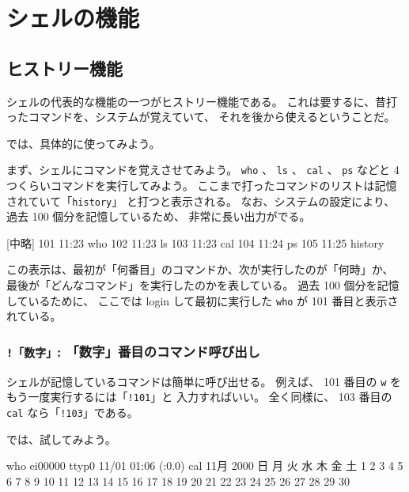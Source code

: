 \newpage

\section{シェルの機能}

\subsection{ヒストリー機能}

シェルの代表的な機能の一つがヒストリー機能である。
これは要するに、昔打ったコマンドを、システムが覚えていて、
それを後から使えるということだ。

\bigskip

では、具体的に使ってみよう。

まず、シェルにコマンドを覚えさせてみよう。
\texttt{who} 、 \texttt{ls} 、 \texttt{cal} 、 \texttt{ps} などと
 4 つくらいコマンドを実行してみよう。
ここまで打ったコマンドのリストは記憶されていて「\texttt{history}」
と打つと表示される。
なお、システムの設定により、過去 100 個分を記憶しているため、
非常に長い出力がでる。

\begin{progls}
 [中略]
   101  11:23   who
   102  11:23   ls
   103  11:23   cal
   104  11:24   ps
   105  11:25   history
%
\end{progls}

この表示は、最初が「何番目」のコマンドか、次が実行したのが「何時」か、
最後が「どんなコマンド」を実行したのかを表している。
過去 100 個分を記憶しているために、
ここでは login して最初に実行した \texttt{who} が 101 番目と表示されている。

\subsubsection{\texttt{!「数字」}: 「数字」番目のコマンド呼び出し}

シェルが記憶しているコマンドは簡単に呼び出せる。
例えば、 101 番目の \texttt{w} をもう一度実行するには「\texttt{!101}」と
入力すればいい。
全く同様に、 103 番目の \texttt{cal} なら「\texttt{!103}」である。

では、試してみよう。

\begin{progls}
who
ei00000  ttyp0    11/01 01:06   (:0.0)
cal
     11月 2000
日 月 火 水 木 金 土
          1  2  3  4
 5  6  7  8  9 10 11
12 13 14 15 16 17 18
19 20 21 22 23 24 25
26 27 28 29 30

%
\end{progls}

